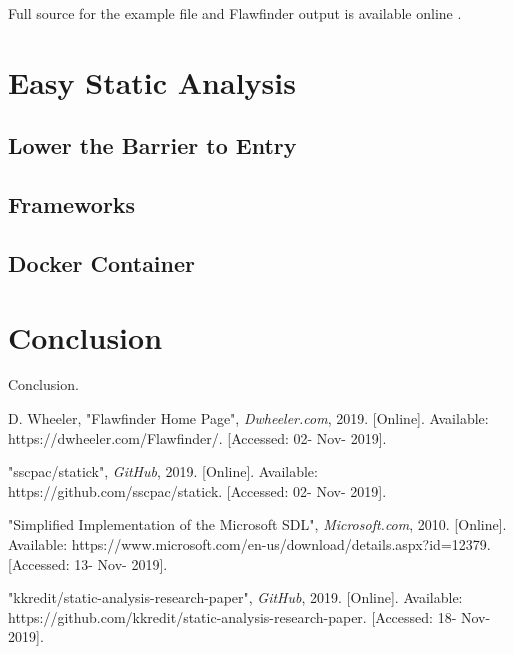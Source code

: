 \documentclass[journal]{IEEEtran}
\begin{document}
Full source for the example file and Flawfinder output is available online \cite{this_repo}.

\section{Easy Static Analysis}

\subsection{Lower the Barrier to Entry}

\subsection{Frameworks}

\subsection{Docker Container}


\section{Conclusion}
Conclusion.



\begin{thebibliography}{00}

 D. Wheeler, "Flawfinder Home Page", \textit{Dwheeler.com}, 2019. [Online].
Available: https://dwheeler.com/Flawfinder/. [Accessed: 02- Nov- 2019].

 "sscpac/statick", \textit{GitHub}, 2019. [Online]. Available:
https://github.com/sscpac/statick. [Accessed: 02- Nov- 2019].

 "Simplified Implementation of the Microsoft SDL", \textit{Microsoft.com}, 2010.
[Online]. Available: https://www.microsoft.com/en-us/download/details.aspx?id=12379. [Accessed: 13-
Nov- 2019].

 "kkredit/static-analysis-research-paper", \textit{GitHub}, 2019. [Online].
Available: https://github.com/kkredit/static-analysis-research-paper. [Accessed: 18- Nov- 2019].

\end{thebibliography}
\end{document}
